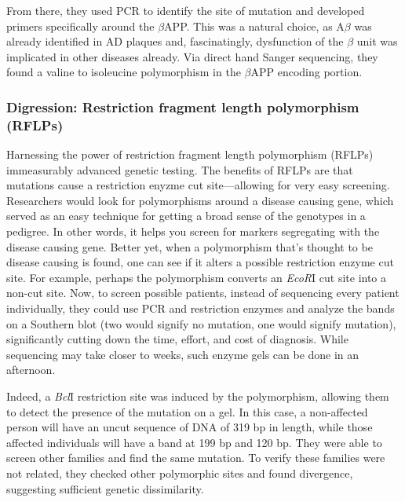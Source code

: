 From there, they used PCR to identify the site of mutation and developed primers specifically around the $\beta$APP. This was a natural choice, as A$\beta$ was already identified in AD plaques and, fascinatingly, dysfunction of the $\beta$ unit was implicated in other diseases already. Via direct hand Sanger sequencing, they found a valine to isoleucine polymorphism in the $\beta$APP encoding portion. \newline

\subsubsection*{Digression: Restriction fragment length polymorphism (RFLPs)}

Harnessing the power of restriction fragment length polymorphism (RFLPs) immeasurably advanced genetic testing. The benefits of RFLPs are that mutations cause a restriction enyzme cut site---allowing for very easy screening. Researchers would look for polymorphisms around a disease causing gene, which served as an easy technique for getting a broad sense of the genotypes in a pedigree. In other words, it helps you screen for markers segregating with the disease causing gene. Better yet, when a polymorphism that's thought to be disease causing is found, one can see if it alters a possible restriction enzyme cut site. For example, perhaps the polymorphism converts an \textit{EcoR}I cut site into a non-cut site. Now, to screen possible patients, instead of sequencing every patient individually, they could use PCR and restriction enzymes and analyze the bands on a Southern blot (two would signify no mutation, one would signify mutation), significantly cutting down the time, effort, and cost of diagnosis. While sequencing may take closer to weeks, such enzyme gels can be done in an afternoon.\newline

Indeed, a \textit{Bcl}I restriction site was induced by the polymorphism, allowing them to detect the presence of the mutation on a gel. In this case, a non-affected person will have an uncut sequence of DNA of 319 bp in length, while those affected individuals will have a band at 199 bp and 120 bp. They were able to screen other families and find the same mutation. To verify these families were not related, they checked other polymorphic sites and found divergence, suggesting sufficient genetic dissimilarity.\newline

